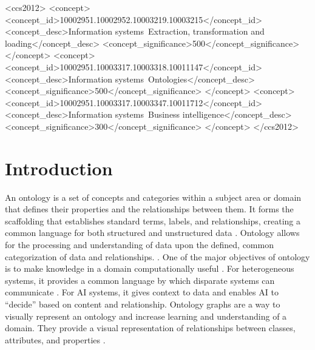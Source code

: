 \documentclass[sigconf]{acmart}
\begin{document}
\begin{CCSXML}
	<ccs2012>
	<concept>
	<concept_id>10002951.10002952.10003219.10003215</concept_id>
	<concept_desc>Information systems~Extraction, transformation and loading</concept_desc>
	<concept_significance>500</concept_significance>
	</concept>
	<concept>
	<concept_id>10002951.10003317.10003318.10011147</concept_id>
	<concept_desc>Information systems~Ontologies</concept_desc>
	<concept_significance>500</concept_significance>
	</concept>
	<concept>
	<concept_id>10002951.10003317.10003347.10011712</concept_id>
	<concept_desc>Information systems~Business intelligence</concept_desc>
	<concept_significance>300</concept_significance>
	</concept>
	</ccs2012>
\end{CCSXML}



\maketitle

\section{Introduction}
An ontology is a set of concepts and categories within a subject area or domain that defines their properties and the relationships between them. It forms the scaffolding that establishes standard terms, labels, and relationships, creating a common language for both structured and unstructured data \cite{gruber1993ontology, chari2020explanation}. Ontology allows for the processing and understanding of data upon the defined, common categorization of data and relationships. \cite{yue2023csm}. One of the major objectives of ontology is to make knowledge in a domain computationally useful \cite{tudorache2020ontology}. For heterogeneous systems, it provides a common language by which disparate systems can communicate \cite{fraga2020ontology, yue2023csm}. For AI systems, it gives context to data and enables AI to “decide” based on content and relationship. Ontology graphs are a way to visually represent an ontology and increase learning and understanding of a domain. They provide a visual representation of relationships between classes, attributes, and properties \cite{gutierrez2018knowledge, yue2021applying}.
\end{document}
